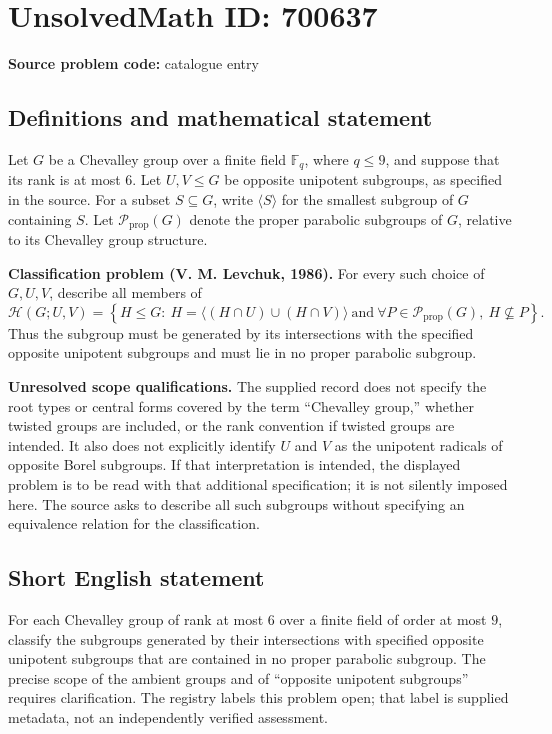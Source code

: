 \documentclass[11pt]{article}
\newcommand{\F}{\mathbb{F}}
\begin{document}
\section*{UnsolvedMath ID: 700637}
\textbf{Source problem code:} catalogue entry
\subsection{Definitions and mathematical statement}
Let \(G\) be a Chevalley group over a finite field \(\F_q\), where \(q\leq 9\), and suppose that its rank is at most \(6\). Let \(U,V\leq G\) be opposite unipotent subgroups, as specified in the source. For a subset \(S\subseteq G\), write \(\langle S\rangle\) for the smallest subgroup of \(G\) containing \(S\). Let \(\mathcal P_{\mathrm{prop}}(G)\) denote the proper parabolic subgroups of \(G\), relative to its Chevalley group structure.

\textbf{Classification problem (V. M. Levchuk, 1986).} For every such choice of \(G,U,V\), describe all members of
\[
\mathcal H(G;U,V)=\left\{H\leq G:\ H=\bigl\langle(H\cap U)\cup(H\cap V)\bigr\rangle\ \text{and}\ \forall P\in\mathcal P_{\mathrm{prop}}(G),\ H\nsubseteq P\right\}.
\]
Thus the subgroup must be generated by its intersections with the specified opposite unipotent subgroups and must lie in no proper parabolic subgroup.

\textbf{Unresolved scope qualifications.} The supplied record does not specify the root types or central forms covered by the term ``Chevalley group,'' whether twisted groups are included, or the rank convention if twisted groups are intended. It also does not explicitly identify \(U\) and \(V\) as the unipotent radicals of opposite Borel subgroups. If that interpretation is intended, the displayed problem is to be read with that additional specification; it is not silently imposed here. The source asks to describe all such subgroups without specifying an equivalence relation for the classification.
\subsection{Short English statement}
For each Chevalley group of rank at most \(6\) over a finite field of order at most \(9\), classify the subgroups generated by their intersections with specified opposite unipotent subgroups that are contained in no proper parabolic subgroup. The precise scope of the ambient groups and of ``opposite unipotent subgroups'' requires clarification. The registry labels this problem open; that label is supplied metadata, not an independently verified assessment.
\end{document}
